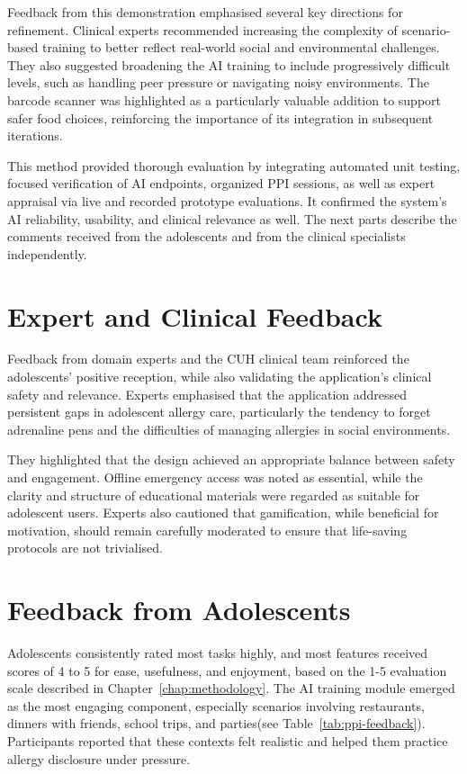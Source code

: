 \documentclass[MScCS]{uccthesis}
\begin{document}
Feedback from this demonstration emphasised several key directions for refinement. Clinical experts recommended increasing the complexity of scenario-based training to better reflect real-world social and environmental challenges. They also suggested broadening the AI training to include progressively difficult levels, such as handling peer pressure or navigating noisy environments. The barcode scanner was highlighted as a particularly valuable addition to support safer food choices, reinforcing the importance of its integration in subsequent iterations.  

This method provided thorough evaluation by integrating automated unit testing, focused verification of AI endpoints, organized PPI sessions, as well as expert appraisal via live and recorded prototype evaluations. It confirmed the system's AI reliability, usability, and clinical relevance as well. The next parts describe the comments received from the adolescents and from the clinical specialists independently.



\section{Expert and Clinical Feedback}
Feedback from domain experts and the CUH clinical team reinforced the adolescents' positive reception, while also validating the application's clinical safety and relevance. Experts emphasised that the application addressed persistent gaps in adolescent allergy care, particularly the tendency to forget adrenaline pens and the difficulties of managing allergies in social environments.  

They highlighted that the design achieved an appropriate balance between safety and engagement. Offline emergency access was noted as essential, while the clarity and structure of educational materials were regarded as suitable for adolescent users. Experts also cautioned that gamification, while beneficial for motivation, should remain carefully moderated to ensure that life-saving protocols are not trivialised.  


\section{Feedback from Adolescents}
Adolescents consistently rated most tasks highly, and most features received scores of 4 to 5 for ease, usefulness, and enjoyment, based on the 1-5 evaluation scale described in Chapter~\ref{chap:methodology}. The AI training module emerged as the most engaging component, especially scenarios involving restaurants, dinners with friends, school trips, and parties(see Table~\ref{tab:ppi-feedback}). Participants reported that these contexts felt realistic and helped them practice allergy disclosure under pressure.  
\end{document}
